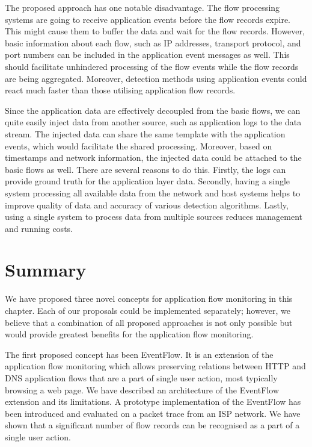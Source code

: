 The proposed approach has one notable disadvantage. The flow processing systems are going to receive application events before the flow records expire. This might cause them to buffer the data and wait for the flow records. However, basic information about each flow, such as IP addresses, transport protocol, and port numbers can be included in the application event messages as well. This should facilitate unhindered processing of the flow events while the flow records are being aggregated. Moreover, detection methods using application events could react much faster than those utilising application flow records.

Since the application data are effectively decoupled from the basic flows, we can quite easily inject data from another source, such as application logs to the data stream. The injected data can share the same template with the application events, which would facilitate the shared processing. Moreover, based on timestamps and network information, the injected data could be attached to the basic flows as well. There are several reasons to do this. Firstly, the logs can provide ground truth for the application layer data. Secondly, having a single system processing all available data from the network and host systems helps to improve quality of data and accuracy of various detection algorithms. Lastly, using a single system to process data from multiple sources reduces management and running costs.

\section{Summary}\label{sec:ng-summary}

We have proposed three novel concepts for application flow monitoring in this chapter. Each of our proposals could be implemented separately; however, we believe that a combination of all proposed approaches is not only possible but would provide greatest benefits for the application flow monitoring.

The first proposed concept has been EventFlow. It is an extension of the application flow monitoring which allows preserving relations between HTTP and DNS application flows that are a part of single user action, most typically browsing a web page. We have described an architecture of the EventFlow extension and its limitations. A prototype implementation of the EventFlow has been introduced and evaluated on a packet trace from an ISP network. We have shown that a significant number of flow records can be recognised as a part of a single user action.

